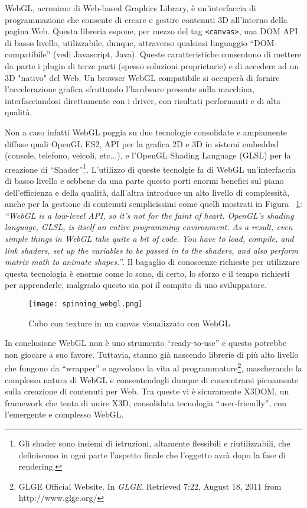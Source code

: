 WebGL, acronimo di Web-based Graphics Library, è un'interfaccia di programmazione che consente di creare e gestire contenuti 3D all'interno della pagina Web. Questa libreria espone, per mezzo del tag \texttt{<canvas>}, una DOM API di basso livello, utilizzabile, dunque, attraverso qualsiasi linguaggio ``DOM-compatibile'' (vedi Javascript, Java). Queste caratteristiche consentono di mettere da parte i plugin di terze parti (spesso soluzioni proprietarie) e di accedere ad un 3D "nativo" del Web. Un browser WebGL compatibile si occuperà di fornire l'accelerazione grafica sfruttando l'hardware presente sulla macchina, interfacciandosi direttamente con i driver, con risultati performanti e di alta qualità.

Non a caso infatti WebGL poggia su due tecnologie consolidate e ampiamente diffuse quali OpenGL ES2, API per la grafica 2D e 3D in sistemi embedded (console, telefono, veicoli, etc...), e l'OpenGL Shading Language (GLSL) per la creazione di ``Shader''\footnote{Gli shader sono insiemi di istruzioni, altamente flessibili e riutilizzabili, che definiscono in ogni parte l'aspetto finale che l'oggetto avrà dopo la fase di rendering.}. L'utilizzo di queste tecnolgie fa di WebGL un'interfaccia di basso livello e sebbene da una parte questo porti enormi benefici sul piano dell'efficienza e della qualità, dall'altra introduce un alto livello di complessità, anche per la gestione di contenuti semplicissimi come quelli mostrati in Figura ~\ref{label:spinWebgl}: \textit{``WebGL is a low-level API, so it's not for the faint of heart. OpenGL's shading language, GLSL, is itself an entire programming environment. As a result, even simple things in WebGL take quite a bit of code. You have to load, compile, and link shaders, set up the variables to be passed in to the shaders, and also perform matrix math to animate shapes.''}. Il bagaglio di conoscenze richieste per utilizzare questa tecnologia è enorme come lo sono, di certo, lo sforzo e il tempo richiesti per apprenderle, malgrado questo sia poi il compito di uno sviluppatore.

\begin{figure}[Ht]
\centering
\texttt{[image: spinning\_webgl.png]}
\caption{Cubo con texture in un canvas visualizzato con WebGL}
\label{label:spinWebgl}
\end{figure}

In conclusione WebGL non è uno strumento ``ready-to-use'' e questo potrebbe non giocare a suo favore. Tuttavia, stanno già nascendo librerie di più alto livello che fungono da ``wrapper'' e agevolano la vita al programmatore\footnote{GLGE Official Website. In \textit{GLGE}. Retrieved 7:22, August 18, 2011 from http://www.glge.org/}, mascherando la complessa natura di WebGL e consentendogli dunque di concentrarsi pienamente sulla creazione di contenuti per Web. Tra queste vi è sicuramente X3DOM, un framework che tenta di unire X3D, consolidata tecnologia ``user-friendly'', con l'emergente e complesso WebGL.


